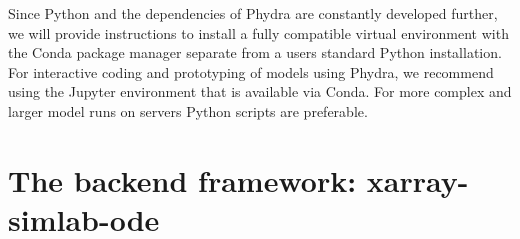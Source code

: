 \documentclass[journal abbreviation, manuscript]{copernicus}
\begin{document}
Since Python and the dependencies of Phydra are constantly developed further, we will provide instructions to install a fully compatible virtual environment with the Conda package manager separate from a users standard Python installation. For interactive coding and prototyping of models using Phydra, we recommend using the Jupyter environment that is available via Conda. For more complex and larger model runs on servers Python scripts are preferable.


\section{The backend framework: xarray-simlab-ode}

\end{document}
